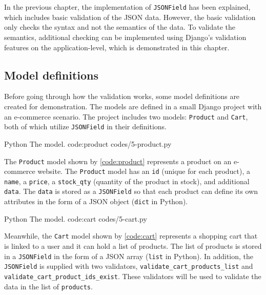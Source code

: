 \chapter{\babLima}

In the previous chapter, the implementation of \verb|JSONField| has been
explained, which includes basic validation of the JSON data. However, the basic
validation only checks the syntax and not the semantics of the data. To
validate the semantics, additional checking can be implemented using Django's
validation features on the application-level, which is demonstrated in this
chapter.

\section{Model definitions}

Before going through how the validation works, some model definitions are
created for demonstration. The models are defined in a small Django project
with an e-commerce scenario. The project includes two models: \verb|Product|
and \verb|Cart|, both of which utilize \verb|JSONField| in their definitions.

\listing
{Python}
{The  model.}
{code:product}
{codes/5-product.py}

The \verb|Product| model shown by \autoref{code:product} represents a product
on an e-commerce website. The \verb|Product| model has an \verb|id| (unique for
each product), a \verb|name|, a \verb|price|, a \verb|stock_qty| (quantity of
the product in stock), and additional \verb|data|. The \verb|data| is stored as
a \verb|JSONField| so that each product can define its own attributes in the
form of a JSON object (\verb|dict| in Python).

\listing
{Python}
{The  model.}
{code:cart}
{codes/5-cart.py}

Meanwhile, the \verb|Cart| model shown by \autoref{code:cart} represents a
shopping cart that is linked to a user and it can hold a list of products. The
list of products is stored in a \verb|JSONField| in the form of a JSON array
(\verb|list| in Python). In addition, the \verb|JSONField| is supplied with two
validators, \verb|validate_cart_products_list| and
\verb|validate_cart_product_ids_exist|. These validators will be used to
validate the data in the list of \verb|products|.

